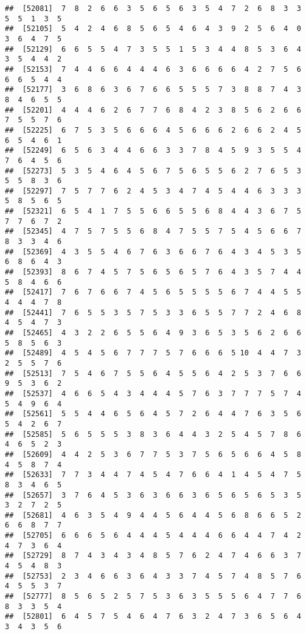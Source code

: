 \documentclass[
]{book}
\begin{document}
\begin{verbatim}
##  [52081]  7  8  2  6  6  3  5  6  5  6  3  5  4  7  2  6  8  3  3  5  5  1  3  5
##  [52105]  5  4  2  4  6  8  5  6  5  4  6  4  3  9  2  5  6  4  0  3  6  4  7  5
##  [52129]  6  6  5  5  4  7  3  5  5  1  5  3  4  4  8  5  3  6  4  3  5  4  4  2
##  [52153]  7  4  4  6  6  4  4  4  6  3  6  6  6  6  4  2  7  5  6  6  6  5  4  4
##  [52177]  3  6  8  6  3  6  7  6  6  5  5  5  7  3  8  8  7  4  3  8  4  6  5  5
##  [52201]  4  4  4  6  2  6  7  7  6  8  4  2  3  8  5  6  2  6  6  7  5  5  7  6
##  [52225]  6  7  5  3  5  6  6  6  4  5  6  6  6  2  6  6  2  4  5  6  5  4  6  1
##  [52249]  6  5  6  3  4  4  6  6  3  3  7  8  4  5  9  3  5  5  4  7  6  4  5  6
##  [52273]  5  3  5  4  6  4  5  6  7  5  6  5  5  6  2  7  6  5  3  5  5  8  3  6
##  [52297]  7  5  7  7  6  2  4  5  3  4  7  4  5  4  4  6  3  3  3  5  8  5  6  5
##  [52321]  6  5  4  1  7  5  5  6  6  5  5  6  8  4  4  3  6  7  5  7  7  6  7  2
##  [52345]  4  7  5  7  5  5  6  8  4  7  5  5  7  5  4  5  6  6  7  8  3  3  4  6
##  [52369]  4  3  5  5  4  6  7  6  3  6  6  7  6  4  3  4  5  3  5  6  8  6  4  3
##  [52393]  8  6  7  4  5  7  5  6  5  6  5  7  6  4  3  5  7  4  4  5  8  4  6  6
##  [52417]  7  6  7  6  6  7  4  5  6  5  5  5  5  6  7  4  4  5  5  4  4  4  7  8
##  [52441]  7  6  5  5  3  5  7  5  3  3  6  5  5  7  7  2  4  6  8  4  5  4  7  3
##  [52465]  4  3  2  2  6  5  5  6  4  9  3  6  5  3  5  6  2  6  6  5  8  5  6  3
##  [52489]  4  5  4  5  6  7  7  7  5  7  6  6  6  5 10  4  4  7  3  2  5  5  7  6
##  [52513]  7  5  4  6  7  5  5  6  4  5  5  6  4  2  5  3  7  6  6  9  5  3  6  2
##  [52537]  4  6  6  5  4  3  4  4  4  5  7  6  3  7  7  7  5  7  4  5  4  9  6  4
##  [52561]  5  5  4  4  6  5  6  4  5  7  2  6  4  4  7  6  3  5  6  5  4  2  6  7
##  [52585]  5  6  5  5  5  3  8  3  6  4  4  3  2  5  4  5  7  8  6  4  6  5  2  3
##  [52609]  4  4  2  5  3  6  7  7  5  3  7  5  6  5  6  6  4  5  8  4  5  8  7  4
##  [52633]  7  7  3  4  4  7  4  5  4  7  6  6  4  1  4  5  4  7  5  8  3  4  6  5
##  [52657]  3  7  6  4  5  3  6  3  6  6  3  6  5  6  5  6  5  3  5  3  2  7  2  5
##  [52681]  4  6  3  5  4  9  4  4  5  6  4  4  5  6  8  6  6  5  2  6  6  8  7  7
##  [52705]  6  6  6  5  6  4  4  4  5  4  4  4  6  6  4  4  7  4  2  4  7  3  6  4
##  [52729]  8  7  4  3  4  3  4  8  5  7  6  2  4  7  4  6  6  3  7  4  5  4  8  3
##  [52753]  2  3  4  6  6  3  6  4  3  3  7  4  5  7  4  8  5  7  6  4  5  5  3  7
##  [52777]  8  5  6  5  2  5  7  5  3  6  3  5  5  5  6  4  7  7  6  8  3  3  5  4
##  [52801]  6  4  5  7  5  4  6  4  7  6  3  2  4  7  3  6  5  6  4  3  4  3  5  6

\end{verbatim}
\end{document}
